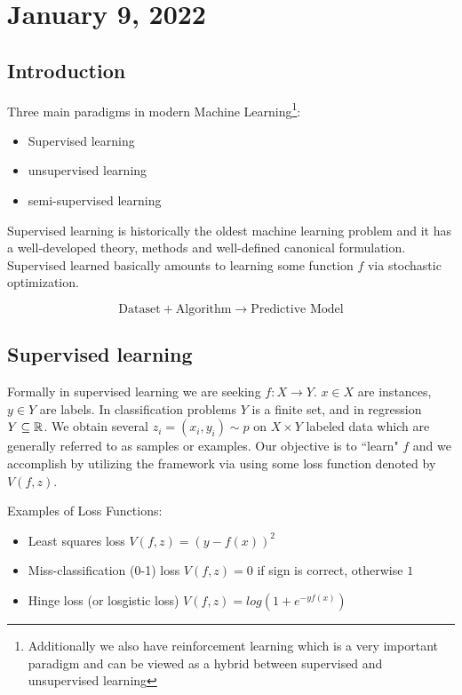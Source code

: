 \section{January 9, 2022}
\subsection{Introduction}
    Three main paradigms in modern Machine Learning\footnote{Additionally we also have reinforcement learning which is a very important paradigm and can be viewed as a hybrid between supervised and unsupervised learning}:
\begin{itemize}
    \item  Supervised learning 
    \item unsupervised learning 
    \item semi-supervised learning
\end{itemize}
Supervised learning is historically the oldest machine learning problem and it has a well-developed theory, methods and well-defined canonical formulation. Supervised learned basically amounts to learning some function $f$ via stochastic optimization.

$$
\text{Dataset} + \text{Algorithm} \to \text{Predictive Model}
$$





\subsection{Supervised learning}
Formally in supervised learning we are seeking $f:X \to Y$. 
$x \in X$ are instances, $y \in Y$ are labels. 
In classification problems $Y$ is a finite set, and in regression $ Y \subseteq \mathbb R$. 
We obtain several $z_i = (x_i, y_i) \sim p$ on  $X \times Y$ labeled data which are generally referred to as samples or examples.
Our objective is to ``learn" $f$ and we accomplish by utilizing the  framework via using some loss function denoted by $V(f,z)$.

Examples of Loss Functions: 
\begin{itemize}
    \item Least squares loss $V(f,z) = (y - f(x))^2$
    \item Miss-classification (0-1) loss $V(f,z) = 0$ if sign is correct, otherwise $1$
    \item Hinge loss (or losgistic loss) $V(f,z) = log(1 + e^{-yf(x)})$
\end{itemize}


